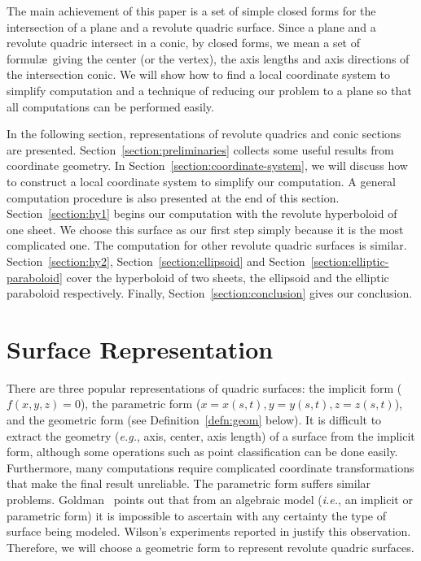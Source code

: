      The main achievement of this paper is a set of simple closed forms for
the intersection of a plane and a revolute quadric surface.  Since a plane and
a revolute quadric intersect in a conic, by closed forms, we mean a set of
formul\ae\ giving the center (or the vertex), the axis lengths and axis
directions of the intersection conic.  We will show how to find a local
coordinate system to simplify computation and a technique of reducing our
problem to a plane so that all computations can be performed easily.

     In the following section, representations of revolute quadrics and
conic sections are presented.  Section~\ref{section:preliminaries} collects
some useful results from coordinate geometry.
In Section~\ref{section:coordinate-system}, we will discuss how to construct
a local coordinate system to simplify our computation.  A general computation
procedure is also presented at the end of this section.
Section~\ref{section:hy1} begins our computation with the
revolute hyperboloid of one sheet.  We choose this surface as our first step
simply because it is the most complicated one.  The computation for
other revolute quadric surfaces is similar.  Section~\ref{section:hy2},
Section~\ref{section:ellipsoid} and Section~\ref{section:elliptic-paraboloid}
cover the hyperboloid of two sheets, the ellipsoid and the elliptic
paraboloid respectively.  Finally, Section~\ref{section:conclusion} gives our
conclusion.


\section{Surface Representation}
\label{section:representation}

     There are three popular representations of quadric surfaces: the implicit
form ($f(x,y,z)=0$), the parametric form ($x=x(s,t),y=y(s,t),z=z(s,t)$),
and the geometric form (see Definition~\ref{defn:geom} below).
It is difficult to extract the geometry ({\em e.g.}, axis, center, axis length)
of a surface from the implicit form,
although some operations such as point classification can
be done easily.  Furthermore, many computations require complicated coordinate
transformations that make the final result unreliable.  The parametric form
suffers similar problems.  Goldman~\cite{goldman:1983b} points out that from
an algebraic model ({\em i.e.}, an implicit or parametric form) it is
impossible to ascertain with any certainty the type of surface being modeled.
Wilson's experiments reported in \cite{wilson:1987} justify this observation.
Therefore, we will choose a geometric form
to represent revolute quadric surfaces.

